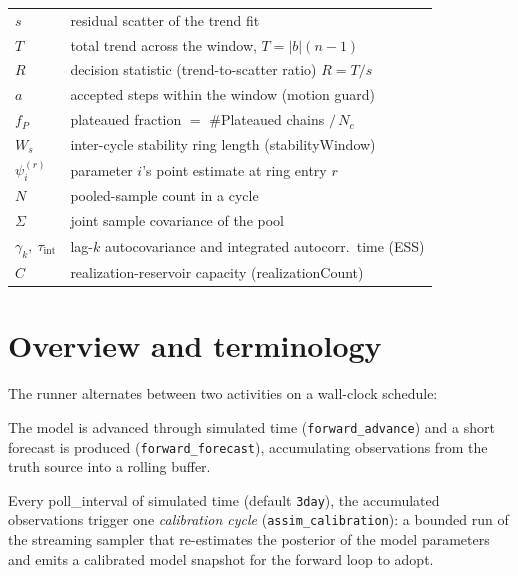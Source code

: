 \documentclass[11pt]{article}
\newcommand{\code}[1]{\texttt{\small #1}}
\newcommand{\param}[1]{\textsf{#1}}
\begin{document}
\begin{center}
\begin{tabular}{@{}ll@{}}
$s$ & residual scatter of the trend fit\\
$T$ & total trend across the window, $T=|b|(n-1)$\\
$R$ & decision statistic (trend-to-scatter ratio) $R=T/s$\\
$a$ & accepted steps within the window (motion guard)\\
$f_P$ & plateaued fraction $=$ \#Plateaued chains $/\,N_c$\\
$W_s$ & inter-cycle stability ring length (\param{stabilityWindow})\\
$\psi^{(r)}_i$ & parameter $i$'s point estimate at ring entry $r$\\
$N$ & pooled-sample count in a cycle\\
$\Sigma$ & joint sample covariance of the pool\\
$\gamma_k,\ \tau_{\text{int}}$ & lag-$k$ autocovariance and integrated autocorr.\ time (ESS)\\
$C$ & realization-reservoir capacity (\param{realizationCount})\\
\bottomrule
\end{tabular}
\end{center}

\section{Overview and terminology}

The runner alternates between two activities on a wall-clock schedule:

\begin{description}[leftmargin=1.4em]
  \item[Forward stepping.] The model is advanced through simulated time
  (\code{forward\_advance}) and a short forecast is produced
  (\code{forward\_forecast}), accumulating observations from the truth
  source into a rolling buffer.
  \item[Calibration cycle.] Every \param{poll\_interval} of simulated
  time (default \code{3day}), the accumulated observations trigger one
  \emph{calibration cycle} (\code{assim\_calibration}): a bounded run of
  the streaming sampler that re-estimates the posterior of the model
  parameters and emits a calibrated model snapshot for the forward loop
  to adopt.
\end{description}
\end{document}

